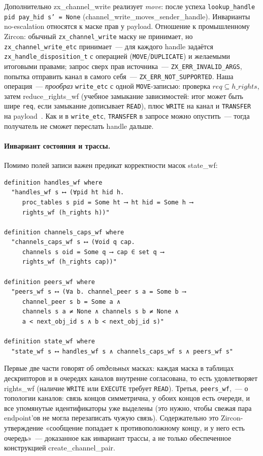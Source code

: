 \documentclass[11pt,a4paper]{article}
\newcommand{\isabel}[1]{{\isabelleit #1}}
\newcommand{\lemmaname}[1]{\isabel{#1}}
\begin{document}
Дополнительно \lemmaname{zx\_channel\_write} реализует \emph{move}: после
успеха \texttt{lookup\_handle pid pay\_hid s' = None}
(\lemmaname{channel\_write\_moves\_sender\_handle}). Инварианты
no-escalation относятся к маске прав у payload. Отношение к
промышленному Zircon: обычный \texttt{zx\_channel\_write} маску не
принимает, но \texttt{zx\_channel\_write\_etc} принимает~--- для
каждого handle задаётся \texttt{zx\_handle\_disposition\_t} с
операцией (\texttt{MOVE}/\texttt{DUPLICATE}) и желаемыми итоговыми
правами; запрос сверх прав источника~---
\texttt{ZX\_ERR\_INVALID\_ARGS}, попытка отправить канал в самого
себя~--- \texttt{ZX\_ERR\_NOT\_SUPPORTED}. Наша операция~--- \emph{прообраз} \texttt{write\_etc} с одной
\texttt{MOVE}-записью: проверка
$\mathit{req}\subseteq h\_rights$, затем
\lemmaname{reduce\_rights\_wf} (учебное замыкание зависимостей: итог
может быть шире \texttt{req}, если замыкание дописывает
\texttt{READ}), плюс
\texttt{WRITE} на канал и \texttt{TRANSFER} на
payload~\cite{zircon_rights,zircon_handles}. Как и в \texttt{write\_etc},
\texttt{TRANSFER} в запросе можно опустить~--- тогда получатель не
сможет переслать handle дальше.

\paragraph{Инвариант состояния и трассы.}
Помимо полей записи важен предикат корректности масок
\lemmaname{state\_wf}:
\begin{lstlisting}
definition handles_wf where
  "handles_wf s ⟷ (∀pid ht hid h.
     proc_tables s pid = Some ht ⟶ ht hid = Some h ⟶
     rights_wf (h_rights h))"

definition channels_caps_wf where
  "channels_caps_wf s ⟷ (∀oid q cap.
     channels s oid = Some q ⟶ cap ∈ set q ⟶
     rights_wf (h_rights cap))"

definition peers_wf where
  "peers_wf s ⟷ (∀a b. channel_peer s a = Some b ⟶
     channel_peer s b = Some a ∧
     channels s a ≠ None ∧ channels s b ≠ None ∧
     a < next_obj_id s ∧ b < next_obj_id s)"

definition state_wf where
  "state_wf s ⟷ handles_wf s ∧ channels_caps_wf s ∧ peers_wf s"
\end{lstlisting}
Первые две части говорят об \emph{отдельных} масках: каждая маска в
таблицах дескрипторов и в очередях каналов внутренне согласована, то
есть удовлетворяет \lemmaname{rights\_wf} (наличие \texttt{WRITE} или
\texttt{EXECUTE} требует \texttt{READ}). Третья,
\texttt{peers\_wf},~--- о топологии каналов: связь концов симметрична,
у обоих концов есть очереди, и все упомянутые идентификаторы уже
выделены (это нужно, чтобы свежая пара endpoint'ов не могла
перезаписать чужую связь). Содержательно это Zircon-утверждение
«сообщение попадает к противоположному концу, и у него есть
очередь»~--- доказанное как инвариант трассы, а не только обеспеченное
конструкцией \lemmaname{create\_channel\_pair}.
\end{document}
